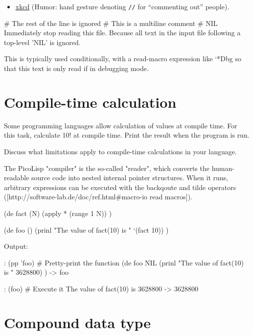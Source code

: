 \begin{itemize}
\item
  \href{http://xkcd.com/156}{xkcd} (Humor: hand gesture denoting
  \texttt{//} for ``commenting out'' people).
\end{itemize}


\begin{wideverbatim}

# The rest of the line is ignored
#{
   This is a
   multiline comment
}#
NIL
Immediately stop reading this file. Because all text in the input file following
a top-level 'NIL' is ignored.

This is typically used conditionally, with a read-macro expression like
`*Dbg
so that this text is only read if in debugging mode.

\end{wideverbatim}

\pagebreak{}
\section*{Compile-time calculation}

Some programming languages allow calculation of values at compile time.
For this task, calculate 10! at compile time. Print the result when the
program is run.

Discuss what limitations apply to compile-time calculations in your
language.


\begin{wideverbatim}

The PicoLisp "compiler" is the so-called "reader", which converts the
human-readable source code into nested internal pointer structures. When it
runs, arbitrary expressions can be executed with the backqoute and tilde
operators ([http://software-lab.de/doc/ref.html#macro-io read macros]).

(de fact (N)
   (apply * (range 1 N)) )

(de foo ()
   (prinl "The value of fact(10) is " `(fact 10)) )

Output:

: (pp 'foo)  # Pretty-print the function
(de foo NIL
   (prinl "The value of fact(10) is " 3628800) )
-> foo

: (foo)  # Execute it
The value of fact(10) is 3628800
-> 3628800

\end{wideverbatim}

\pagebreak{}
\section*{Compound data type}


